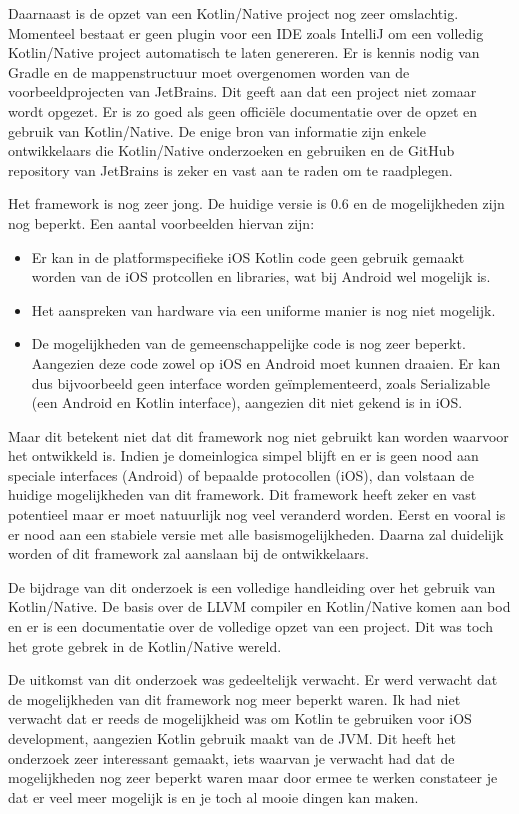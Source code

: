Daarnaast is de opzet van een Kotlin/Native project nog zeer omslachtig. Momenteel bestaat er geen plugin voor een IDE zoals IntelliJ om een volledig Kotlin/Native project automatisch te laten genereren. Er is kennis nodig van Gradle en de mappenstructuur moet overgenomen worden van de voorbeeldprojecten van JetBrains. Dit geeft aan dat een project niet zomaar wordt opgezet. Er is zo goed als geen officiële documentatie over de opzet en gebruik van Kotlin/Native. De enige bron van informatie zijn enkele ontwikkelaars die Kotlin/Native onderzoeken en gebruiken en de GitHub repository van JetBrains is zeker en vast aan te raden om te raadplegen.

Het framework is nog zeer jong. De huidige versie is 0.6 en de mogelijkheden zijn nog beperkt. Een aantal voorbeelden hiervan zijn:
\begin{itemize}
	\item Er kan in de platformspecifieke iOS Kotlin code geen gebruik gemaakt worden van de iOS protcollen en libraries, wat bij Android wel mogelijk is.
	\item Het aanspreken van hardware via een uniforme manier is nog niet mogelijk.
	\item De mogelijkheden van de gemeenschappelijke code is nog zeer beperkt. Aangezien deze code zowel op iOS en Android moet kunnen draaien. Er kan dus bijvoorbeeld geen interface worden geïmplementeerd, zoals Serializable (een Android en Kotlin interface), aangezien dit niet gekend is in iOS.
\end{itemize}

Maar dit betekent niet dat dit framework nog niet gebruikt kan worden waarvoor het ontwikkeld is. Indien je domeinlogica simpel blijft en er is geen nood aan speciale interfaces (Android) of bepaalde protocollen (iOS), dan volstaan de huidige mogelijkheden van dit framework. Dit framework heeft zeker en vast potentieel maar er moet natuurlijk nog veel veranderd worden. Eerst en vooral is er nood aan een stabiele versie met alle basismogelijkheden. Daarna zal duidelijk worden of dit framework zal aanslaan bij de ontwikkelaars.

De bijdrage van dit onderzoek is een volledige handleiding over het gebruik van Kotlin/Native. De basis over de LLVM compiler en Kotlin/Native komen aan bod en er is een documentatie over de volledige opzet van een project. Dit was toch het grote gebrek in de Kotlin/Native wereld.

De uitkomst van dit onderzoek was gedeeltelijk verwacht. Er werd verwacht dat de mogelijkheden van dit framework nog meer beperkt waren. Ik had niet verwacht dat er reeds de mogelijkheid was om Kotlin te gebruiken voor iOS development, aangezien Kotlin gebruik maakt van de JVM. Dit heeft het onderzoek zeer interessant gemaakt, iets waarvan je verwacht had dat de mogelijkheden nog zeer beperkt waren maar door ermee te werken constateer je dat er veel meer mogelijk is en je toch al mooie dingen kan maken.


